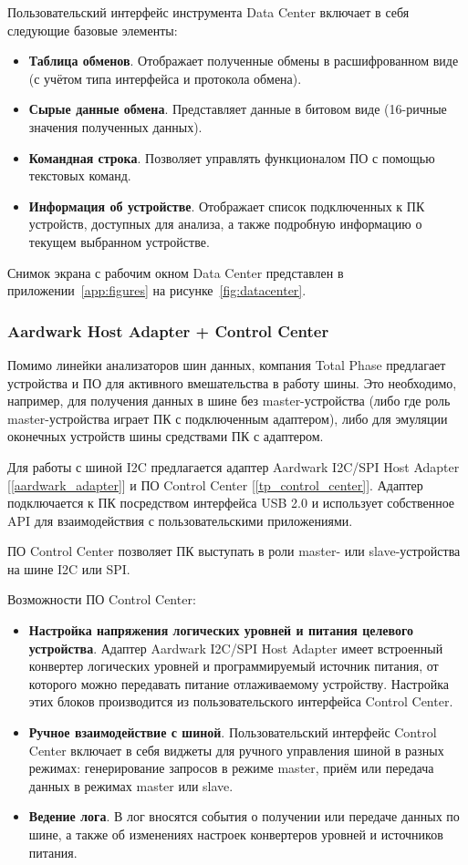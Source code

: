 Пользовательский интерфейс инструмента Data Center включает в себя следующие базовые элементы:

\begin{itemize}
 \item \textbf{Таблица обменов}. Отображает полученные обмены в расшифрованном виде (с учётом типа интерфейса и протокола обмена).
 \item \textbf{Сырые данные обмена}. Представляет данные в битовом виде (16-ричные значения полученных данных).
 \item \textbf{Командная строка}. Позволяет управлять функционалом ПО с помощью текстовых команд.
 \item \textbf{Информация об устройстве}. Отображает список подключенных к ПК устройств, доступных для анализа, а также подробную информацию о текущем выбранном устройстве.
\end{itemize}

Снимок экрана с рабочим окном Data Center представлен в приложении~\ref{app:figures} на рисунке~\ref{fig:datacenter}.

\subsubsection*{Aardwark Host Adapter + Control Center}

Помимо линейки анализаторов шин данных, компания Total Phase предлагает устройства и ПО для активного вмешательства в работу шины. Это необходимо, например, для получения данных в шине без master-устройства (либо где роль master-устройства играет ПК с подключенным адаптером), либо для эмуляции оконечных устройств шины средствами ПК с адаптером.

Для работы с шиной I2C предлагается адаптер Aardwark I2C/SPI Host Adapter [\ref{aardwark_adapter}] и ПО Control Center [\ref{tp_control_center}]. Адаптер подключается к ПК посредством интерфейса USB 2.0 и использует собственное API для взаимодействия с пользовательскими приложениями.

ПО Control Center позволяет ПК выступать в роли master- или slave-устройства на шине I2C или SPI.

Возможности ПО Control Center:

\begin{itemize}
 \item \textbf{Настройка напряжения логических уровней и питания целевого устройства}. Адаптер Aardwark I2C/SPI Host Adapter имеет встроенный конвертер логических уровней и программируемый источник питания, от которого можно передавать питание отлаживаемому устройству. Настройка этих блоков производится из пользовательского интерфейса Control Center.
 \item \textbf{Ручное взаимодействие с шиной}. Пользовательский интерфейс Control Center включает в себя виджеты для ручного управления шиной в разных режимах: генерирование запросов в режиме master, приём или передача данных в режимах master или slave.
 \item \textbf{Ведение лога}. В лог вносятся события о получении или передаче данных по шине, а также об изменениях настроек конвертеров уровней и источников питания.
\end{itemize}


